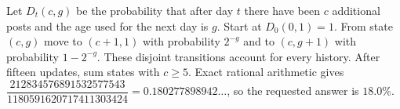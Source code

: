Let $D_t(c,g)$ be the probability that after day $t$ there have been $c$ additional posts and the age used for the next day is $g$. Start at $D_0(0,1)=1$. From state $(c,g)$ move to $(c+1,1)$ with probability $2^{-g}$ and to $(c,g+1)$ with probability $1-2^{-g}$. These disjoint transitions account for every history. After fifteen updates, sum states with $c\ge5$. Exact rational arithmetic gives $\dfrac{212834576891532577543}{1180591620717411303424}=0.180277898942\ldots$, so the requested answer is $\boxed{18.0\%}$.
